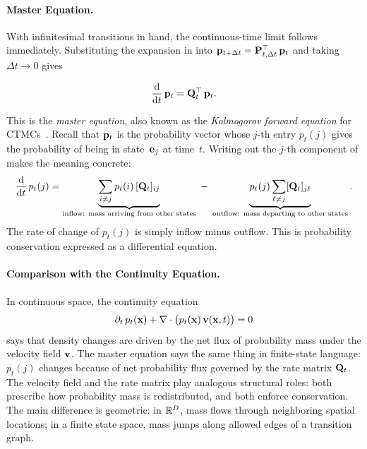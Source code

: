 \paragraph{Master Equation.}
With infinitesimal transitions in hand, the continuous-time limit follows
immediately. Substituting the expansion in 
into ${\mathbf{p}}_{t+\Delta t} = {\mathbf{P}}_{t,\Delta t}^\top\,{\mathbf{p}}_t$ and taking
$\Delta t \to 0$ gives
\begin{mdframed}
\begin{equation}
\frac{\mathop{}\!\mathrm{d}}{\mathop{}\!\mathrm{d} t}\,{\mathbf{p}}_t = {\mathbf{Q}}_t^\top\,{\mathbf{p}}_t.
\label{eq:master-equation-vector}
\end{equation}
\end{mdframed}
This is the \emph{master equation}, also known as the \emph{Kolmogorov
forward equation} for CTMCs~\citep{norris1998markov}. Recall that ${\mathbf{p}}_t$ is the probability
vector whose $j$-th entry $p_t(j)$ gives the probability of being in
state~${\mathbf{e}}_j$ at time~$t$. Writing out the $j$-th component of
 makes the meaning concrete:
\begin{equation}
\frac{\mathop{}\!\mathrm{d}}{\mathop{}\!\mathrm{d} t}\,p_t(j)
= \underbrace{\sum_{i \neq j} p_t(i)\,[{\mathbf{Q}}_t]_{ij}}_{\text{inflow: mass arriving from other states}}
\;-\;
\underbrace{p_t(j)\sum_{\ell \neq j} [{\mathbf{Q}}_t]_{j\ell}}_{\text{outflow: mass departing to other states}}.
\label{eq:master-equation-component}
\end{equation}
The rate of change of $p_t(j)$ is simply inflow minus outflow. This is
probability conservation expressed as a differential equation.

\paragraph{Comparison with the Continuity Equation.}
In continuous space, the continuity equation
\[
\partial_t\,p_t({\mathbf{x}}) + \nabla \cdot
\big(p_t({\mathbf{x}})\,{\mathbf{v}}({\mathbf{x}},t)\big) = 0
\]
says that density changes are driven by the net flux of probability mass
under the velocity field ${\mathbf{v}}$. The master equation says the same
thing in finite-state language: $p_t(j)$ changes because of net probability flux governed by the
rate matrix ${\mathbf{Q}}_t$. The velocity field and the rate matrix play
analogous structural roles: both prescribe how probability mass is
redistributed, and both enforce conservation. The main difference is geometric: in $\mathbb{R}^D$, mass flows through neighboring spatial locations; in a finite state space, mass jumps along allowed edges of a transition graph.

